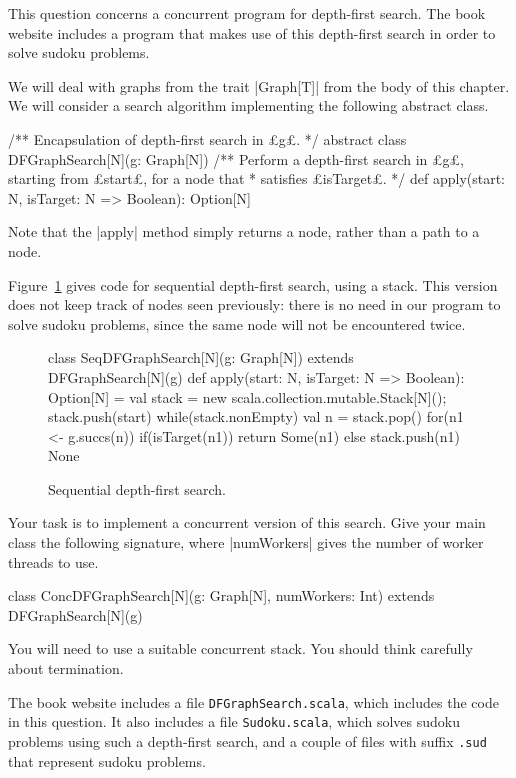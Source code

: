 \begin{question}
\label{ex:dfs} 
This question concerns a concurrent program for depth-first search.  The book
website includes a program that makes use of this depth-first search in order
to solve sudoku problems.

We will deal with graphs from the trait |Graph[T]| from the body of this
chapter.  We will consider a search algorithm implementing the following
abstract class.
%
\begin{scala}
/** Encapsulation of depth-first search in £g£. */
abstract class DFGraphSearch[N](g: Graph[N]){
  /** Perform a depth-first search in £g£, starting from £start£, for a node that
    * satisfies £isTarget£.  */
  def apply(start: N, isTarget: N => Boolean): Option[N] 
}
\end{scala}
%
Note that the |apply| method simply returns a node, rather than a path to a
node. 

Figure~\ref{fig:dfs-seq} gives code for sequential depth-first search, using a
stack.  This
version does not keep track of nodes seen previously: there is no need in our
program to solve sudoku problems, since the same node will not be encountered
twice. 


\begin{figure}
\begin{scala}
class SeqDFGraphSearch[N](g: Graph[N]) extends DFGraphSearch[N](g){
  def apply(start: N, isTarget: N => Boolean): Option[N] = {
    val stack = new scala.collection.mutable.Stack[N](); stack.push(start)
    while(stack.nonEmpty){
      val n = stack.pop()
      for(n1 <- g.succs(n)){
        if(isTarget(n1)) return Some(n1) else stack.push(n1)
      }
    }
    None
  }
}
\end{scala}
\caption{Sequential depth-first search.}
\label{fig:dfs-seq}
\end{figure}


Your task is to implement a concurrent version of this search.  Give your main
class the following signature, where |numWorkers| gives the number of worker
threads to use.
%
\begin{scala}
class ConcDFGraphSearch[N](g: Graph[N], numWorkers: Int)
    extends DFGraphSearch[N](g)
\end{scala}
%
You will need to use a suitable concurrent stack.  You should think carefully
about termination.

The book website includes a file \texttt{DFGraphSearch.scala}, which includes
the code in this question.  It also includes a file \texttt{Sudoku.scala},
which solves sudoku problems using such a depth-first search, and a couple of
files with suffix \texttt{.sud} that represent sudoku problems.
\end{question}

